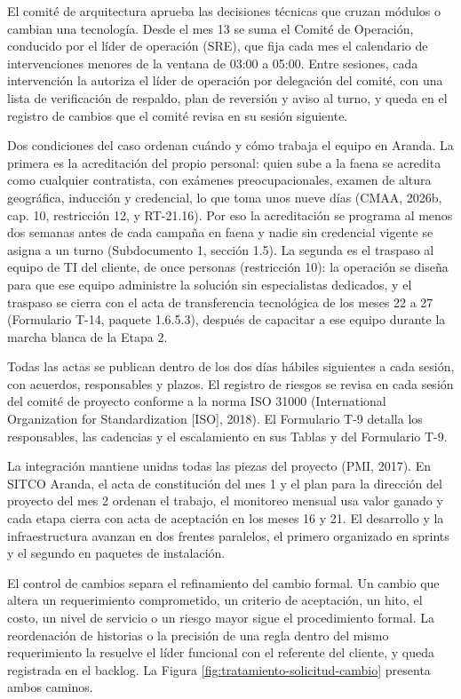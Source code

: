 \documentclass[subdoc]{../../comun/overfore}
\begin{document}
El comité de arquitectura aprueba las decisiones técnicas que cruzan módulos o cambian una tecnología. Desde el mes 13 se suma el Comité de Operación, conducido por el líder de operación (SRE), que fija cada mes el calendario de intervenciones menores de la ventana de 03:00 a 05:00. Entre sesiones, cada intervención la autoriza el líder de operación por delegación del comité, con una lista de verificación de respaldo, plan de reversión y aviso al turno, y queda en el registro de cambios que el comité revisa en su sesión siguiente.

Dos condiciones del caso ordenan cuándo y cómo trabaja el equipo en Aranda. La primera es la acreditación del propio personal: quien sube a la faena se acredita como cualquier contratista, con exámenes preocupacionales, examen de altura geográfica, inducción y credencial, lo que toma unos nueve días (CMAA, 2026b, cap. 10, restricción 12, y RT-21.16). Por eso la acreditación se programa al menos dos semanas antes de cada campaña en faena y nadie sin credencial vigente se asigna a un turno (Subdocumento 1, sección 1.5). La segunda es el traspaso al equipo de TI del cliente, de once personas (restricción 10): la operación se diseña para que ese equipo administre la solución sin especialistas dedicados, y el traspaso se cierra con el acta de transferencia tecnológica de los meses 22 a 27 (Formulario T-14, paquete 1.6.5.3), después de capacitar a ese equipo durante la marcha blanca de la Etapa 2.

Todas las actas se publican dentro de los dos días hábiles siguientes a cada sesión, con acuerdos, responsables y plazos. El registro de riesgos se revisa en cada sesión del comité de proyecto conforme a la norma ISO 31000 (International Organization for Standardization [ISO], 2018). El Formulario T-9 detalla los responsables, las cadencias y el escalamiento en sus Tablas  y  del Formulario T-9.

La integración mantiene unidas todas las piezas del proyecto (PMI, 2017). En SITCO Aranda, el acta de constitución del mes 1 y el plan para la dirección del proyecto del mes 2 ordenan el trabajo, el monitoreo mensual usa valor ganado y cada etapa cierra con acta de aceptación en los meses 16 y 21. El desarrollo y la infraestructura avanzan en dos frentes paralelos, el primero organizado en sprints y el segundo en paquetes de instalación.

El control de cambios separa el refinamiento del cambio formal. Un cambio que altera un requerimiento comprometido, un criterio de aceptación, un hito, el costo, un nivel de servicio o un riesgo mayor sigue el procedimiento formal. La reordenación de historias o la precisión de una regla dentro del mismo requerimiento la resuelve el líder funcional con el referente del cliente, y queda registrada en el backlog. La Figura \ref{fig:tratamiento-solicitud-cambio} presenta ambos caminos.
\end{document}
